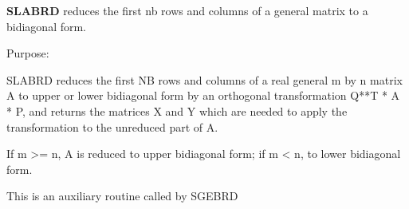 {\bfseries S\+L\+A\+B\+R\+D} reduces the first nb rows and columns of a general matrix to a bidiagonal form. 

 \begin{DoxyParagraph}{Purpose\+: }
\begin{DoxyVerb} SLABRD reduces the first NB rows and columns of a real general
 m by n matrix A to upper or lower bidiagonal form by an orthogonal
 transformation Q**T * A * P, and returns the matrices X and Y which
 are needed to apply the transformation to the unreduced part of A.

 If m >= n, A is reduced to upper bidiagonal form; if m < n, to lower
 bidiagonal form.

 This is an auxiliary routine called by SGEBRD\end{DoxyVerb}
 
\end{DoxyParagraph}

